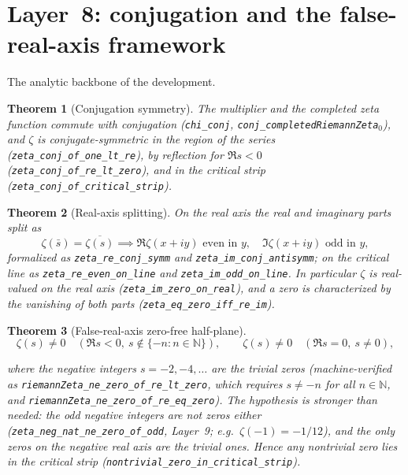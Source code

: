 \documentclass{article}
\newtheorem{theorem}{Theorem}[section]
\newcommand{\N}{\mathbb{N}}
\newcommand{\zt}{\zeta}
\begin{document}
\section{Layer~8: conjugation and the false-real-axis framework}
\label{sec:L8}

The analytic backbone of the development.

\begin{theorem}[Conjugation symmetry]
\label{thm:conj}
The multiplier and the completed zeta function commute with conjugation
(\texttt{chi\_conj}, \texttt{conj\_completedRiemannZeta}\(_0\)), and $\zt$
is conjugate-symmetric in the region of the series
(\texttt{zeta\_conj\_of\_one\_lt\_re}), by reflection for $\Re s<0$
(\texttt{zeta\_conj\_of\_re\_lt\_zero}), and in the critical strip
(\texttt{zeta\_conj\_of\_critical\_strip}).
\end{theorem}

\begin{theorem}[Real-axis splitting]
\label{thm:realaxis}
On the real axis the real and imaginary parts split as
\[
\zt(\bar s)=\overline{\zt(s)}
\implies
\Re\zt(x+iy)\text{ even in }y,\quad \Im\zt(x+iy)\text{ odd in }y,
\]
formalized as \texttt{zeta\_re\_conj\_symm} and
\texttt{zeta\_im\_conj\_antisymm}; on the critical line as
\texttt{zeta\_re\_even\_on\_line} and \texttt{zeta\_im\_odd\_on\_line}. In
particular $\zt$ is real-valued on the real axis
(\texttt{zeta\_im\_zero\_on\_real}), and a zero is characterized by the
vanishing of both parts (\texttt{zeta\_eq\_zero\_iff\_re\_im}).
\end{theorem}

\begin{theorem}[False-real-axis zero-free half-plane]
\label{thm:falseaxis}
\begin{equation}
\label{eq:false}
\zt(s)\neq 0\quad(\Re s<0,\ s\notin\{-n:n\in\N\}),\qquad
\zt(s)\neq 0\quad(\Re s=0,\ s\neq 0),
\end{equation}
\begin{sloppypar}where the negative integers $s=-2,-4,\dots$ are the trivial zeros
(machine-verified as \texttt{riemannZeta\_ne\_zero\_of\_re\_lt\_zero},
which requires $s\neq -n$ for all $n\in\N$, and
\texttt{riemannZeta\_ne\_zero\_of\_re\_eq\_zero}).
The hypothesis is stronger than needed: the odd negative integers are
not zeros either (\texttt{zeta\_neg\_nat\_ne\_zero\_of\_odd}, Layer~9;
e.g.\ $\zt(-1)=-1/12$), and the only zeros on the negative real axis are
the trivial ones. Hence any nontrivial zero lies in the critical strip
(\texttt{nontrivial\_zero\_in\_critical\_strip}).\end{sloppypar}
\end{theorem}
\end{document}
